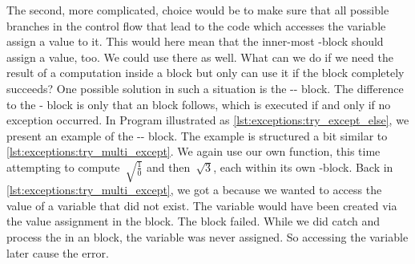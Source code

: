 The second, more complicated, choice would be to make sure that all possible branches in the control flow that lead to the code which accesses the variable assign a value to it.
This would here mean that the inner-most -block should assign a value, too.
We could use  there as well.%
%
\FloatBarrier%
\endhsection%
%
%
%
What can we do if we need the result of a computation inside a  block but only can use it if the  block completely succeeds?
One possible solution in such a situation is the -- block.
The difference to the - block is only that an  block follows, which is executed if and only if no exception occurred.%
%
%
\FloatBarrier%
%
%
%
%
In Program  illustrated as \cref{lst:exceptions:try_except_else}, we present an example of the -- block.
The example is structured a bit similar to \cref{lst:exceptions:try_multi_except}.
We again use our own  function, this time attempting to compute~$\sqrt{\frac{1}{0}}$ and then~$\sqrt{3}$, each within its own -block.
Back in \cref{lst:exceptions:try_multi_except}, we got a  because we wanted to access the value of a variable that did not exist.
The variable would have been created via the value assignment in the  block.
The  block failed.
While we did catch and process the  in an  block, the variable was never assigned.
So accessing the variable later cause the error.

